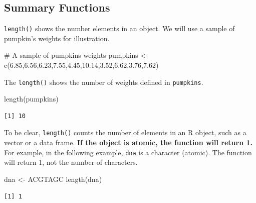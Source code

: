 \documentclass[
  letterpaper,
]{book}
\newenvironment{Shaded}{\begin{snugshade}}{\end{snugshade}}
\newcommand{\CommentTok}[1]{\textcolor[rgb]{0.37,0.37,0.37}{#1}}
\newcommand{\FloatTok}[1]{\textcolor[rgb]{0.68,0.00,0.00}{#1}}
\newcommand{\FunctionTok}[1]{\textcolor[rgb]{0.28,0.35,0.67}{#1}}
\newcommand{\NormalTok}[1]{\textcolor[rgb]{0.00,0.23,0.31}{#1}}
\newcommand{\OtherTok}[1]{\textcolor[rgb]{0.00,0.23,0.31}{#1}}
\newcommand{\StringTok}[1]{\textcolor[rgb]{0.13,0.47,0.30}{#1}}
\begin{document}

\subsection*{Summary Functions}\label{summary-functions}

\texttt{length()} shows the number elements in an object. We will use a
sample of pumpkin's weights for illustration.

\begin{Shaded}
\begin{Highlighting}[]
\CommentTok{\# A sample of pumpkins\textquotesingle{} weights}
\NormalTok{pumpkins }\OtherTok{\textless{}{-}} \FunctionTok{c}\NormalTok{(}\FloatTok{6.85}\NormalTok{,}\FloatTok{6.56}\NormalTok{,}\FloatTok{6.23}\NormalTok{,}\FloatTok{7.55}\NormalTok{,}\FloatTok{4.45}\NormalTok{,}\FloatTok{10.14}\NormalTok{,}\FloatTok{3.52}\NormalTok{,}\FloatTok{6.62}\NormalTok{,}\FloatTok{3.76}\NormalTok{,}\FloatTok{7.62}\NormalTok{)}
\end{Highlighting}
\end{Shaded}

The \texttt{length()} shows the number of weights defined in
\texttt{pumpkins}.

\begin{Shaded}
\begin{Highlighting}[]
\FunctionTok{length}\NormalTok{(pumpkins)}
\end{Highlighting}
\end{Shaded}

\begin{verbatim}
[1] 10
\end{verbatim}

To be clear, \texttt{length()} counts the number of elements in an R
object, such as a vector or a data frame. \textbf{If the object is
atomic, the function will return 1.} For example, in the following
example, \texttt{dna} is a character (atomic). The function will return
1, not the number of characters.

\begin{Shaded}
\begin{Highlighting}[]
\NormalTok{dna }\OtherTok{\textless{}{-}} \StringTok{\textquotesingle{}ACGTAGC\textquotesingle{}}
\FunctionTok{length}\NormalTok{(dna)}
\end{Highlighting}
\end{Shaded}

\begin{verbatim}
[1] 1
\end{verbatim}
\end{document}
